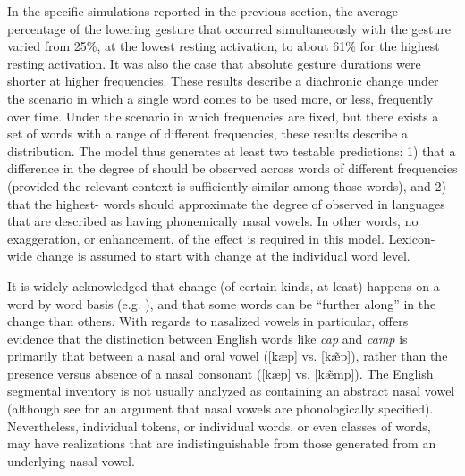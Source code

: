 In the specific simulations reported in the previous section, the
average percentage of the  lowering gesture that occurred simultaneously with the  gesture varied from 25\%, at the lowest resting activation, to about 61\% for the highest resting activation. It was also the
case that absolute gesture durations were shorter
at higher frequencies. These results describe a diachronic change
under the scenario in which a single word comes to be used more, or
less, frequently over time. Under the scenario in which frequencies
are fixed, but there exists a set of words with a range of different
frequencies, these results describe a  distribution. The
model thus generates at least two testable predictions: 1) that a
difference in the degree of  should be observed
across words of different frequencies (provided the relevant 
context is sufficiently similar among those words), and 2) that the
highest- words should approximate the degree of 
observed in languages that are described as having phonemically nasal
vowels. In other words, no exaggeration, or enhancement, of the effect
is required in this model. Lexicon-wide change is assumed to start
with change at the individual word level.

It is widely acknowledged that change (of certain kinds, at least)
happens on a word by word basis (e.g. \citealt{Phillips1984,Bybee2002,Pierrehumbert2002}),
and that some words can be ``further along'' in the change than others.
With regards to nasalized vowels in particular, \citet{malecot1960vowel}
offers evidence that the distinction between English words like \textit{cap}
and \textit{camp} is primarily that between a nasal and oral vowel
({[kæp]} vs. {[kæ̃p]}), rather than the presence
versus absence of a nasal consonant ({[kæp]} vs. {[kæ̃mp]}).
The English segmental inventory is not usually analyzed as containing
an abstract nasal vowel (although see \citealt{Sole1992} for an argument
that nasal vowels are phonologically specified). Nevertheless, individual
tokens, or individual words, or even classes of words, may have 
realizations that are indistinguishable from those generated from
an underlying nasal vowel. 
